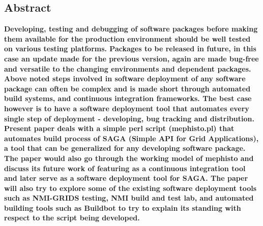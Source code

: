 \documentclass[a4paper,10pt]{article}
\begin{document}
\begin{multicols}{2}
\section*{\normalsize \textbf{Abstract}}
\textbf{Developing, testing and debugging of software packages before making them available for the production environment should be well 
tested on various testing platforms. Packages to be released in future, in this case an update made for the previous version, again are
made bug-free and versatile to the changing environments and dependent packages. Above noted steps involved in software deployment of 
any software package can often be complex and is made short through automated build systems, and continuous integration frameworks. 
The best case however is to have a software deployment tool that automates every single step of deployment - developing, bug tracking and distribution. 
Present paper deals with a simple perl script (mephisto.pl) that automates build process of SAGA (Simple API for Grid Applications), 
a tool that can be generalized for any developing software package. The paper would also go through the working model of mephisto and 
discuss its future work of featuring as a continuous integration tool and later serve as a software deployment tool for SAGA. 
The paper will also try to explore some of the existing software deployment tools such as NMI-GRIDS testing, NMI build and test lab, 
and automated building tools such as Buildbot to try to explain its standing with respect to the script being developed. 
}

\end{multicols}
\end{document}

